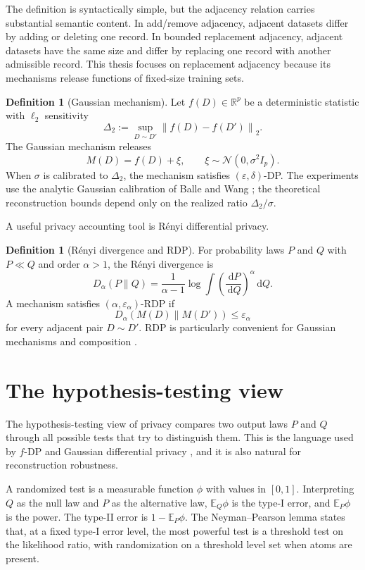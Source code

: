 \documentclass[11pt,a4paper]{report}
\theoremstyle{plain}
\theoremstyle{definition}
\newtheorem{definition}[theorem]{Definition}
\theoremstyle{remark}
\newcommand{\R}{\mathbb{R}}
\newcommand{\N}{\mathcal{N}}
\newcommand{\E}{\mathbb{E}}
\newcommand{\dd}{\,\mathrm d}
\newcommand{\norm}[1]{\left\lVert #1\right\rVert}
\begin{document}
The definition is syntactically simple, but the adjacency relation carries substantial semantic content.  In add/remove adjacency, adjacent datasets differ by adding or deleting one record.  In bounded replacement adjacency, adjacent datasets have the same size and differ by replacing one record with another admissible record.  This thesis focuses on replacement adjacency because its mechanisms release functions of fixed-size training sets.

\begin{definition}[Gaussian mechanism]
Let $f(D)\in\R^p$ be a deterministic statistic with $\ell_2$ sensitivity
\[
\Delta_2:=\sup_{D\sim D'}\norm{f(D)-f(D')}_2.
\]
The Gaussian mechanism releases
\[
M(D)=f(D)+\xi,
\qquad
\xi\sim\N(0,\sigma^2I_p).
\]
When $\sigma$ is calibrated to $\Delta_2$, the mechanism satisfies $(\varepsilon,\delta)$-DP.  The experiments use the analytic Gaussian calibration of Balle and Wang \cite{balle2018analytic}; the theoretical reconstruction bounds depend only on the realized ratio $\Delta_2/\sigma$.
\end{definition}

A useful privacy accounting tool is R\'enyi differential privacy.

\begin{definition}[R\'enyi divergence and RDP]
For probability laws $P$ and $Q$ with $P\ll Q$ and order $\alpha>1$, the R\'enyi divergence is
\[
D_\alpha(P\|Q)
=
\frac{1}{\alpha-1}\log \int \left(\frac{\dd P}{\dd Q}\right)^\alpha \dd Q.
\]
A mechanism satisfies $(\alpha,\varepsilon_\alpha)$-RDP if
\[
D_\alpha(M(D)\|M(D'))\le \varepsilon_\alpha
\]
for every adjacent pair $D\sim D'$.  RDP is particularly convenient for Gaussian mechanisms and composition \cite{mironov2017}.
\end{definition}

\section{The hypothesis-testing view}
\label{sec:bg-fdp}

The hypothesis-testing view of privacy compares two output laws $P$ and $Q$ through all possible tests that try to distinguish them.  This is the language used by $f$-DP and Gaussian differential privacy \cite{dong2022fdp}, and it is also natural for reconstruction robustness.

A randomized test is a measurable function $\phi$ with values in $[0,1]$.  Interpreting $Q$ as the null law and $P$ as the alternative law, $\E_Q\phi$ is the type-I error, and $\E_P\phi$ is the power.  The type-II error is $1-\E_P\phi$.  The Neyman--Pearson lemma states that, at a fixed type-I error level, the most powerful test is a threshold test on the likelihood ratio, with randomization on a threshold level set when atoms are present.
\end{document}
